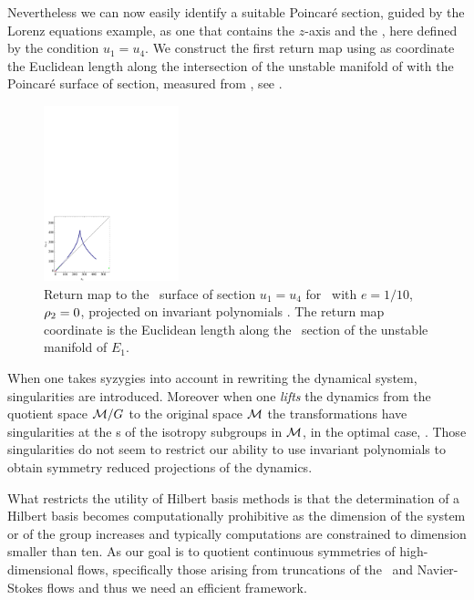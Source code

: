 Nevertheless we can now easily identify a suitable Poincar\'e
section, guided by the Lorenz equations example,
as one that contains the $z$-axis and
the \reqv, here defined by the condition $u_1=u_4$.
We
construct the first return map using as coordinate the
Euclidean length along the intersection of the unstable
manifold of  with the Poincar\'e surface of section,
measured from , see .


\begin{figure}[ht]
\begin{center}
\includegraphics[width=0.35\textwidth]{../figs/CLEipRM}
\end{center}
\caption[Return map for Complex Lorenz flow, invariant polynomials]
{Return map to the \Poincare\
surface of section $u_1=u_4$ for \CLe\ with $e=1/10$, $\rho_2=0$,
projected on invariant polynomials \refeq{eq:ipLaser}.
The return map coordinate is the Euclidean
length along the \Poincare\ section of the unstable manifold of $E_1$.
    }
\label{fig:CLEipRM}
\end{figure}


When one takes syzygies into account in rewriting the
dynamical system, singularities are introduced. Moreover when
one \emph{lifts} the dynamics from the quotient space
$\mathcal{M}/G$ to the original space $\mathcal{M}$ the transformations
have singularities at the \fixedsp s of
the isotropy subgroups in $\mathcal{M}$, in the optimal case, \cf
{}. Those singularities do not seem to
restrict our ability to use invariant polynomials to obtain
symmetry reduced projections of the dynamics.

What restricts the utility of Hilbert basis methods is that the
determination of a Hilbert basis becomes computationally
prohibitive as the dimension of the system or of the group
increases and typically
computations are constrained to dimension smaller than ten. As
our goal is to quotient continuous symmetries of
high-dimensional flows, specifically those arising from
truncations of the \KS\ and Navier-Stokes flows
and thus we need an efficient framework.




